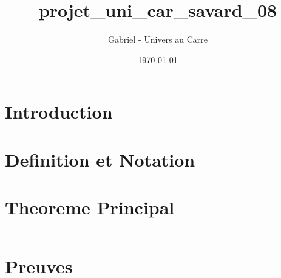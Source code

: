 \documentclass[12pt]{article}
\title{projet_uni_car_savard_08}
\author{Gabriel - Univers au Carre}
\date{\today}
\begin{document}
\maketitle


\section{Introduction}



\section{Definition et Notation}



\section{Theoreme Principal}


\begin{equation}
\end{equation}


\section{Preuves}


\end{document}
